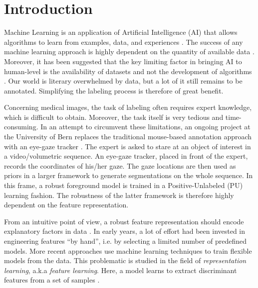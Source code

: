 %
%
%

\chapter{Introduction}
Machine Learning is an application of Artificial Intelligence (AI) that allows algorithms to learn from examples, data, and experiences \cite{Kohavi1998}. The success of any machine learning approach is highly dependent on the quantity of available data \cite{Wissner2016}.
Moreover, it has been suggested that the key limiting factor in bringing AI to human-level is the availability of datasets and not the development of algorithms \cite{Wissner2016}.
Our world is literary overwhelmed by data, but a lot of it still remains to be annotated. Simplifying the labeling process is therefore of great benefit.

Concerning medical images, the task of labeling often requires expert knowledge, which is difficult to obtain. Moreover, the task itself is very tedious and time-consuming. In an attempt to circumvent these limitations, an ongoing project at the University of Bern replaces the traditional mouse-based annotation approach with an eye-gaze tracker \cite{Lejeune2017}.
The expert is asked to stare at an object of interest in a video/volumetric sequence. An eye-gaze tracker, placed in front of the expert, records the coordinates of his/her gaze. The gaze locations are then used as priors in a larger framework to generate segmentations on the whole sequence.
In this frame, a robust foreground model is trained in a Positive-Unlabeled (PU) learning fashion.
The robustness of the latter framework is therefore highly dependent on the feature representation.

From an intuitive point of view, a robust feature representation should encode explanatory factors in data \cite{Bengio2013}. In early years, a lot of effort had been invested in engineering features ``by hand'', i.e. by selecting a limited number of predefined models.
More recent approaches use machine learning techniques to train flexible models from the data. This problematic is studied in the field of \textit{representation learning}, a.k.a \textit{feature learning}. Here, a model learns to extract discriminant features from a set of samples \cite{Goodfellow2015}.

